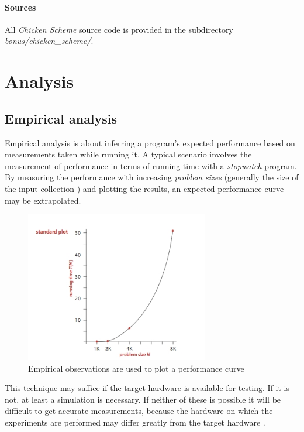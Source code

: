 \documentclass{article}
\begin{document}
\paragraph{Sources}
All {\em Chicken Scheme} source code is provided in the subdirectory {\em bonus/chicken\_scheme/}.


\newpage


\section{Analysis}

\subsection{Empirical analysis}
Empirical analysis is about inferring a program's expected performance based on measurements taken while running it. A typical
scenario involves the measurement of performance in terms of running time with a {\em stopwatch} program. By measuring the
performance with increasing {\em problem sizes} (generally the size of the input collection
\cite[p.25]{introduction-to-algorithms}) and plotting the results, an expected performance curve may be extrapolated.

\begin{figure}[H]
  \centering
  \includegraphics[width=8cm]{empirical_measurement}
  \caption{Empirical observations are used to plot a performance curve \cite[p.17]{empirical-analysis-princeton}}
\end{figure}

This technique may suffice if the target hardware is available for testing. If it is not, at least a simulation is necessary.
If neither of these is possible it will be difficult to get accurate measurements, because the hardware on which the experiments
are performed may differ greatly from the target hardware \cite[p.22]{empirical-analysis-princeton}.
\end{document}
